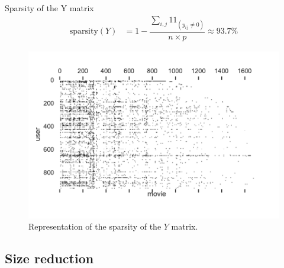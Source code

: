 \documentclass[unknownkeysallowed]{beamer}
\begin{document}
\begin{frame}{Sparsity of the Y matrix}
\begin{align*}
    \text{sparsity}(Y)&= 1 - \dfrac{\sum_{i,j} 1\!\!1_{(y_{ij} \neq 0)}}{n\times p} \approx 93.7 \%
\end{align*}

\begin{figure}[H]
\centering
  \includegraphics[scale=0.53]{./images/sparse.pdf}
  \caption{Representation of the sparsity of the $Y$ matrix.}
  \label{fig:sparse_fig}
\end{figure}

\end{frame}


\subsection{Size reduction}
\label{sec:reduction}
\end{document}
